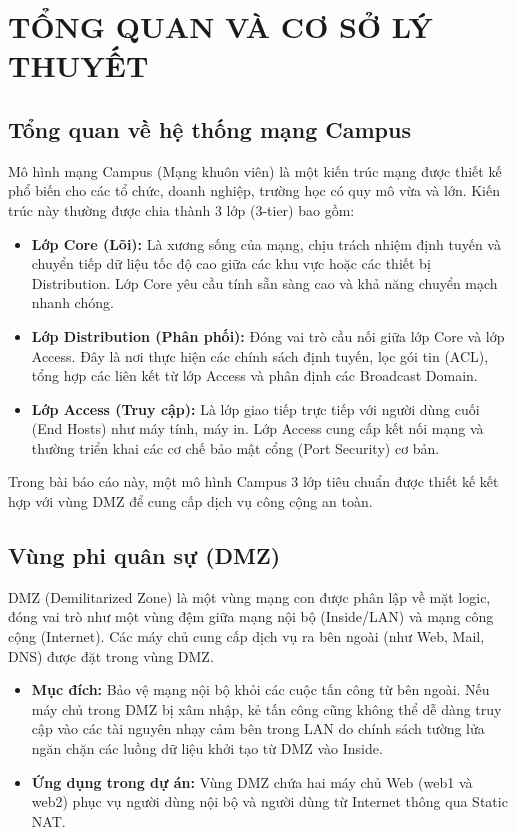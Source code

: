 \section{TỔNG QUAN VÀ CƠ SỞ LÝ THUYẾT}

\subsection{Tổng quan về hệ thống mạng Campus}
Mô hình mạng Campus (Mạng khuôn viên) là một kiến trúc mạng được thiết kế phổ biến cho các tổ chức, doanh nghiệp, trường học có quy mô vừa và lớn. Kiến trúc này thường được chia thành 3 lớp (3-tier) bao gồm:
\begin{itemize}
    \item \textbf{Lớp Core (Lõi):} Là xương sống của mạng, chịu trách nhiệm định tuyến và chuyển tiếp dữ liệu tốc độ cao giữa các khu vực hoặc các thiết bị Distribution. Lớp Core yêu cầu tính sẵn sàng cao và khả năng chuyển mạch nhanh chóng.
    \item \textbf{Lớp Distribution (Phân phối):} Đóng vai trò cầu nối giữa lớp Core và lớp Access. Đây là nơi thực hiện các chính sách định tuyến, lọc gói tin (ACL), tổng hợp các liên kết từ lớp Access và phân định các Broadcast Domain.
    \item \textbf{Lớp Access (Truy cập):} Là lớp giao tiếp trực tiếp với người dùng cuối (End Hosts) như máy tính, máy in. Lớp Access cung cấp kết nối mạng và thường triển khai các cơ chế bảo mật cổng (Port Security) cơ bản.
\end{itemize}
Trong bài báo cáo này, một mô hình Campus 3 lớp tiêu chuẩn được thiết kế kết hợp với vùng DMZ để cung cấp dịch vụ công cộng an toàn.

\subsection{Vùng phi quân sự (DMZ)}
DMZ (Demilitarized Zone) là một vùng mạng con được phân lập về mặt logic, đóng vai trò như một vùng đệm giữa mạng nội bộ (Inside/LAN) và mạng công cộng (Internet). Các máy chủ cung cấp dịch vụ ra bên ngoài (như Web, Mail, DNS) được đặt trong vùng DMZ.
\begin{itemize}
    \item \textbf{Mục đích:} Bảo vệ mạng nội bộ khỏi các cuộc tấn công từ bên ngoài. Nếu máy chủ trong DMZ bị xâm nhập, kẻ tấn công cũng không thể dễ dàng truy cập vào các tài nguyên nhạy cảm bên trong LAN do chính sách tường lửa ngăn chặn các luồng dữ liệu khởi tạo từ DMZ vào Inside.
    \item \textbf{Ứng dụng trong dự án:} Vùng DMZ chứa hai máy chủ Web (web1 và web2) phục vụ người dùng nội bộ và người dùng từ Internet thông qua Static NAT.
\end{itemize}

